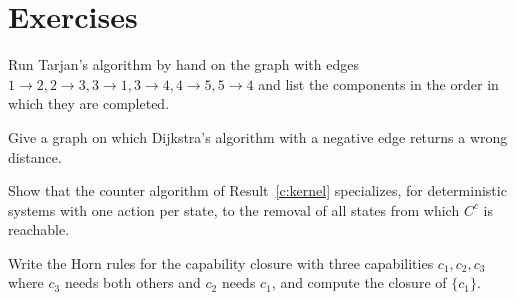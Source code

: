 \section*{Exercises}

\begin{exercise}
Run Tarjan's algorithm by hand on the graph with edges $1\to2,2\to3,3\to1,3\to4,4\to5,5\to4$ and list the components in the order in which they are completed.
\end{exercise}
\begin{exercise}
Give a graph on which Dijkstra's algorithm with a negative edge returns a wrong distance.
\end{exercise}
\begin{exercise}
Show that the counter algorithm of Result~\ref{c:kernel} specializes, for deterministic systems with one action per state, to the removal of all states from which $C^c$ is reachable.
\end{exercise}
\begin{exercise}
Write the Horn rules for the capability closure with three capabilities $c_1,c_2,c_3$ where $c_3$ needs both others and $c_2$ needs $c_1$, and compute the closure of $\{c_1\}$.
\end{exercise}
